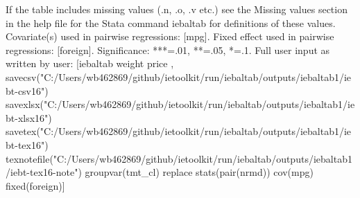 If the table includes missing values (.n, .o, .v etc.) see the Missing values section in the help file for the Stata command iebaltab for definitions of these values. Covariate(s) used in pairwise regressions: [mpg]. Fixed effect used in pairwise regressions: [foreign]. Significance: ***=.01, **=.05, *=.1. Full user input as written by user: [iebaltab weight price , savecsv("C:/Users/wb462869/github/ietoolkit/run/iebaltab/outputs/iebaltab1/iebt-csv16") savexlsx("C:/Users/wb462869/github/ietoolkit/run/iebaltab/outputs/iebaltab1/iebt-xlsx16") savetex("C:/Users/wb462869/github/ietoolkit/run/iebaltab/outputs/iebaltab1/iebt-tex16") texnotefile("C:/Users/wb462869/github/ietoolkit/run/iebaltab/outputs/iebaltab1/iebt-tex16-note") groupvar(tmt\_cl) replace stats(pair(nrmd)) cov(mpg) fixed(foreign)] 
